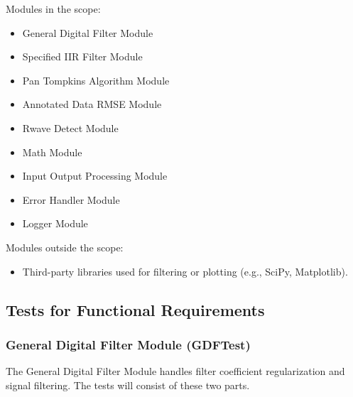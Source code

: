 \documentclass[12pt, titlepage]{article}
\begin{document}
Modules in the scope:
\begin{itemize}
  \item General Digital Filter Module
  \item Specified IIR Filter Module
  \item Pan Tompkins Algorithm Module
  \item Annotated Data RMSE Module
  \item Rwave Detect Module
  \item Math Module
  \item Input Output Processing Module
  \item Error Handler Module
  \item Logger Module
\end{itemize}

Modules outside the scope:
\begin{itemize}
  \item Third-party libraries used for filtering or plotting (e.g., SciPy,
  Matplotlib).
\end{itemize}

\subsection{Tests for Functional Requirements}


\subsubsection{General Digital Filter Module (GDFTest)}

The General Digital Filter Module handles filter coefficient regularization and
signal filtering. The tests will consist of these two parts.
\end{document}
